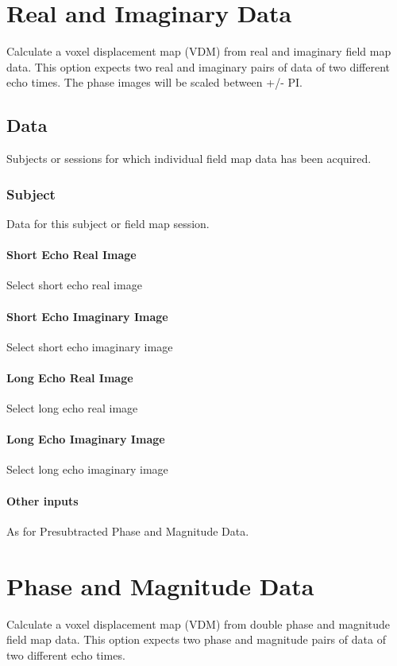 \section{Real and Imaginary Data}
Calculate a voxel displacement map (VDM) from real and imaginary field map data. This option expects two real and imaginary pairs of data of two different echo times. The phase images will be scaled between +/- PI.


\subsection{Data}
Subjects or sessions for which individual field map data has been acquired.


\subsubsection{Subject}
Data for this subject or field map session.


\paragraph{Short Echo Real Image}
Select short echo real image


\paragraph{Short Echo Imaginary Image}
Select short echo imaginary image


\paragraph{Long Echo Real Image}
Select long echo real image


\paragraph{Long Echo Imaginary Image}
Select long echo imaginary image

\paragraph{Other inputs}
As for Presubtracted Phase and Magnitude Data.

\section{Phase and Magnitude Data}
Calculate a voxel displacement map (VDM) from double phase and magnitude field map data. This option expects two phase and magnitude pairs of data of two different echo times.


